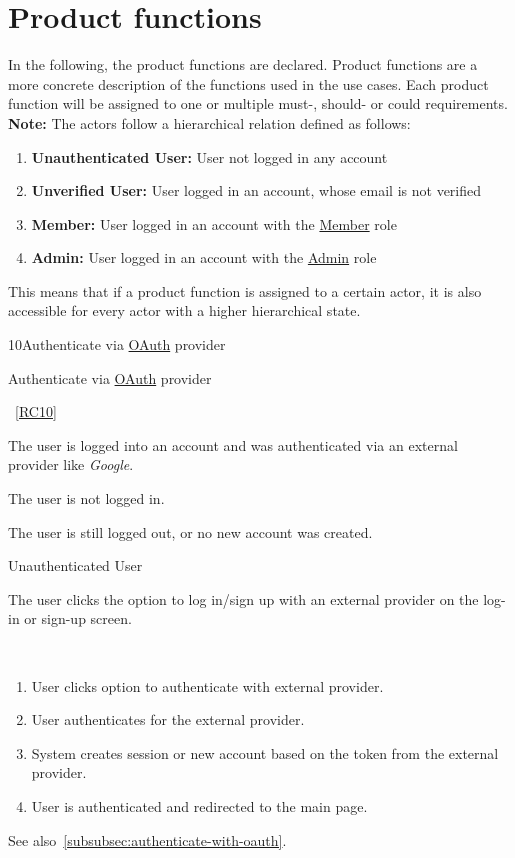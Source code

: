 
\chapter{Product functions}
In the following, the product functions are declared. \newline
Product functions are a more concrete description of the functions used in the use cases.
Each product function will be assigned to one or multiple must-, should- or could requirements.
\newline
\newline
\textbf{Note:} The actors follow a hierarchical relation defined as follows:
\begin{enumerate}
    \item \textbf{Unauthenticated User:} User not logged in any account
	\item \textbf{Unverified User:} User logged in an account, whose email is not verified
	\item \textbf{Member:} User logged in an account with the \hyperref[def:member]{Member} role
	\item \textbf{Admin:} User logged in an account with the \hyperref[def:admin]{Admin} role
\end{enumerate}
This means that if a product function is assigned to a certain actor, it is also accessible for every actor with a higher hierarchical state.

\vspace{3.5em}

\begin{function}{10}{Authenticate via \hyperref[def:oauth]{OAuth} provider}
	\item[Use case:] Authenticate via \hyperref[def:oauth]{OAuth} provider
	\item[Criteria:]~\ref{RC10}
	\item[Target:] The user is logged into an account and was authenticated via an external provider like \textit{Google}.
	\item[Precondition:] The user is not logged in.
	\item[Post-condition failure:] The user is still logged out, or no new account was created.
	\item[Actors:] Unauthenticated User
	\item[Trigger:] The user clicks the option to log in/sign up with an external provider on the log-in or sign-up screen.
	\item[Description:] ~
	\begin{enumerate}
		\item User clicks option to authenticate with external provider.
		\item User authenticates for the external provider.
		\item System creates session or new account based on the token from the external provider.
		\item User is authenticated and redirected to the main page.
	\end{enumerate}
	See also~\ref{subsubsec:authenticate-with-oauth}.
\end{function}

